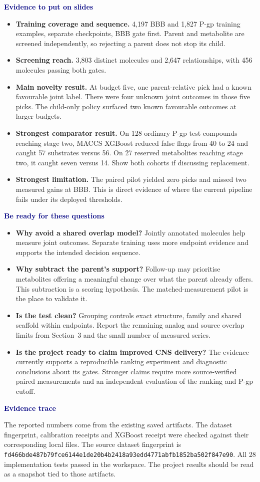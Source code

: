 \documentclass[11pt,a4paper]{article}
\newcommand{\code}[1]{\nolinkurl{#1}}
\newcommand{\lead}[1]{\par\smallskip\textbf{\textcolor{Navy}{#1}}\par\nobreak}
\newenvironment{compact}{\begin{itemize}[leftmargin=*,topsep=2pt,itemsep=1pt,parsep=0pt]}{\end{itemize}}
\begin{document}
\lead{Evidence to put on slides}
\begin{compact}
\item \textbf{Training coverage and sequence.} 4,197 BBB and 1,827 P-gp training examples, separate checkpoints, BBB gate first. Parent and metabolite are screened independently, so rejecting a parent does not stop its child.
\item \textbf{Screening reach.} 3,803 distinct molecules and 2,647 relationships, with 456 molecules passing both gates.
\item \textbf{Main novelty result.} At budget five, one parent-relative pick had a known favourable joint label. There were four unknown joint outcomes in those five picks. The child-only policy surfaced two known favourable outcomes at larger budgets.
\item \textbf{Strongest comparator result.} On 128 ordinary P-gp test compounds reaching stage two, MACCS XGBoost reduced false flags from 40 to 24 and caught 57 substrates versus 56. On 27 reserved metabolites reaching stage two, it caught seven versus 14. Show both cohorts if discussing replacement.
\item \textbf{Strongest limitation.} The paired pilot yielded zero picks and missed two measured gains at BBB. This is direct evidence of where the current pipeline fails under its deployed thresholds.
\end{compact}

\lead{Be ready for these questions}
\begin{compact}
\item \textbf{Why avoid a shared overlap model?} Jointly annotated molecules help measure joint outcomes. Separate training uses more endpoint evidence and supports the intended decision sequence.
\item \textbf{Why subtract the parent's support?} Follow-up may prioritise metabolites offering a meaningful change over what the parent already offers. This subtraction is a scoring hypothesis. The matched-measurement pilot is the place to validate it.
\item \textbf{Is the test clean?} Grouping controls exact structure, family and shared scaffold within endpoints. Report the remaining analog and source overlap limits from Section~3 and the small number of measured series.
\item \textbf{Is the project ready to claim improved CNS delivery?} The evidence currently supports a reproducible ranking experiment and diagnostic conclusions about its gates. Stronger claims require more source-verified paired measurements and an independent evaluation of the ranking and P-gp cutoff.
\end{compact}

\lead{Evidence trace}
The reported numbers come from the existing saved artifacts. The dataset fingerprint, calibration receipts and XGBoost receipt were checked against their corresponding local files. The source dataset fingerprint is \code{fd466bde487b79fce6144e1de20b4b2418a93edd4771abfb1852ba502f847e90}. All 28 implementation tests passed in the workspace. The project results should be read as a snapshot tied to those artifacts.
\end{document}
